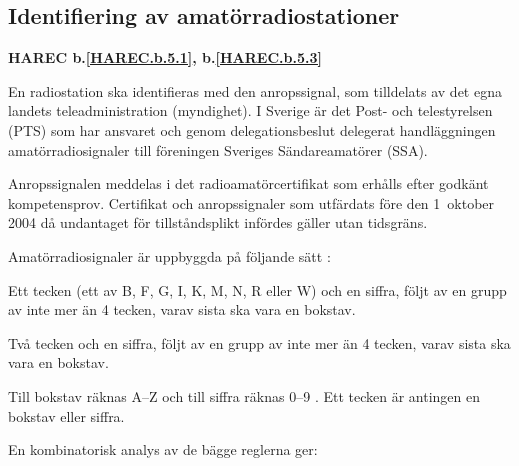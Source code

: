 \subsection{Identifiering av amatörradiostationer}
\textbf{
HAREC b.\ref{HAREC.b.5.1}\label{myHAREC.b.5.1},
 b.\ref{HAREC.b.5.3}\label{myHAREC.b.5.3}
}

En radiostation ska identifieras med den anropssignal, som
tilldelats av det egna landets teleadministration (myndighet). I Sverige
är det Post- och telestyrelsen (PTS) som har ansvaret och genom
delegationsbeslut delegerat handläggningen amatörradiosignaler till föreningen Sveriges Sändareamatörer (SSA).

Anropssignalen meddelas i det radioamatörcertifikat som erhålls efter godkänt kompetensprov.
Certifikat och anropssignaler som utfärdats före den 1~oktober 2004 då undantaget för tillståndsplikt infördes gäller utan tidsgräns.

Amatörradiosignaler är uppbyggda på följande sätt \cite[§19.68, §19.69]{ITU-RR}:

Ett tecken (ett av B, F, G, I, K, M, N, R eller W) och en siffra, följt av en
grupp av inte mer än 4 tecken, varav sista ska vara en bokstav.

Två tecken och en siffra, följt av en grupp av inte mer än 4 tecken, varav
sista ska vara en bokstav.

Till bokstav räknas A--Z och till siffra räknas 0--9 \cite[§19.45]{ITU-RR}.
Ett tecken är antingen en bokstav eller siffra.

En kombinatorisk analys av de bägge reglerna ger:

